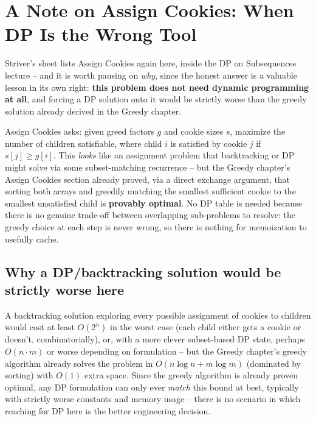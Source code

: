 \section{A Note on Assign Cookies: When DP Is the Wrong Tool}
\label{sec:dp-assign-cookies-note}

\noindent Striver's sheet lists Assign Cookies again here, inside the DP
on Subsequences lecture -- and it is worth pausing on \emph{why}, since
the honest answer is a valuable lesson in its own right: \textbf{this
problem does not need dynamic programming at all}, and forcing a DP
solution onto it would be strictly worse than the greedy solution
already derived in the Greedy chapter.

\begin{patternbox}
Assign Cookies asks: given greed factors $g$ and cookie sizes $s$,
maximize the number of children satisfiable, where child $i$ is
satisfied by cookie $j$ if $s[j] \ge g[i]$. This \emph{looks} like an
assignment problem that backtracking or DP might solve via some
subset-matching recurrence -- but the Greedy chapter's Assign Cookies section
already proved, via a direct exchange argument, that sorting both arrays
and greedily matching the smallest sufficient cookie to the smallest
unsatisfied child is \textbf{provably optimal}. No DP table is needed
because there is no genuine trade-off between overlapping sub-problems
to resolve: the greedy choice at each step is never wrong, so there is
nothing for memoization to usefully cache.
\end{patternbox}

\subsection*{Why a DP/backtracking solution would be strictly worse here}

A backtracking solution exploring every possible assignment of cookies to
children would cost at least $O(2^{n})$ in the worst case (each child
either gets a cookie or doesn't, combinatorially), or, with a more
clever subset-based DP state, perhaps $O(n \cdot m)$ or worse depending
on formulation -- but the Greedy chapter's greedy algorithm
already solves the problem in $O(n \log n + m \log m)$ (dominated by
sorting) with $O(1)$ extra space. Since the greedy algorithm is already
proven optimal, any DP formulation can only ever \emph{match} this
bound at best, typically with strictly worse constants and memory
usage -- there is no scenario in which reaching for DP here is the
better engineering decision.

